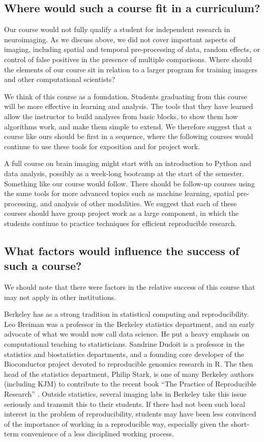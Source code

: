 \subsection{Where would such a course fit in a curriculum?}

Our course would not fully qualify a student for independent research in
neuroimaging.  As we discuss above, we did not cover important aspects of
imaging, including spatial and temporal pre-processing of data, random effects,
or control of false positives in the presence of multiple comparisons.  Where
should the elements of our course sit in relation to a larger program for
training imagers and other computational scientists?

We think of this course as a foundation.  Students graduating from this course
will be more effective in learning and analysis.  The tools that they have
learned allow the instructor to build analyses from basic blocks, to
show them how algorithms work, and make them simple to extend.  We therefore
suggest that a course like ours should be first in a sequence, where the
following courses would continue to use these tools for exposition and for
project work.

A full course on brain imaging might start with an introduction to Python and
data analysis, possibly as a week-long bootcamp at the start of the semester.
Something like our course would follow.  There should be follow-up courses
using the same tools for more advanced topics such as machine learning,
spatial pre-processing, and analysis of other modalities. We suggest that each
of these courses should have group project work as a large component, in which
the students continue to practice techniques for efficient reproducible
research.

\subsection{What factors would influence the success of such a course?}

We should note that there were factors in the relative success of this
course that may not apply in other institutions.

Berkeley has as a strong tradition in statistical computing and
reproducibility.  Leo Breiman was a professor in the Berkeley statistics
department, and an early advocate of what we would now call data science.  He
put a heavy emphasis on computational teaching to statisticians.  Sandrine
Dudoit is a professor in the statistics and biostatistics departments, and a
founding core developer of the Bioconductor project devoted to reproducible
genomics research in R.  The then head of the statistics department, Philip
Stark, is one of many Berkeley authors (including KJM) to contribute to the
recent book ``The Practice of Reproducible Research''
\citep{kitzes2017practice}. Outside statistics, several imaging labs in
Berkeley take this issue seriously and transmit this to their students.  If
there had not been such local interest in the problem of reproducibility,
students may have been less convinced of the importance of
working in a reproducible way, especially given the short-term convenience
of a less disciplined working process.

